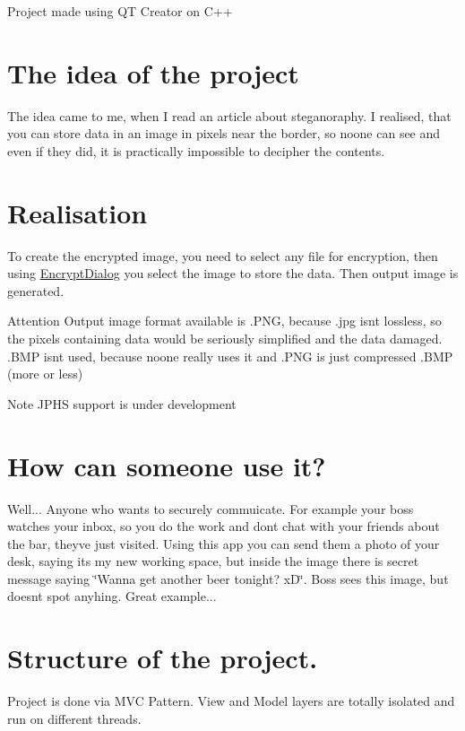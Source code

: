 Project made using QT Creator on C++\hypertarget{index_idea}{}\section{The idea of the project}\label{index_idea}
The idea came to me, when I read an article about steganoraphy. I realised, that you can store data in an image in pixels near the border, so noone can see and even if they did, it is practically impossible to decipher the contents. \hypertarget{index_real}{}\section{Realisation}\label{index_real}
To create the encrypted image, you need to select any file for encryption, then using \mbox{\hyperlink{class_encrypt_dialog}{Encrypt\+Dialog}} you select the image to store the data. Then output image is generated. \begin{DoxyAttention}{Attention}
Output image format available is .P\+NG, because .jpg isn\textquotesingle{}t lossless, so the pixels containing data would be seriously simplified and the data damaged. .B\+MP isn\textquotesingle{}t used, because noone really uses it and .P\+NG is just compressed .B\+MP (more or less) 
\end{DoxyAttention}
\begin{DoxyNote}{Note}
J\+P\+HS support is under development
\end{DoxyNote}
\hypertarget{index_use}{}\section{How can someone use it?}\label{index_use}
Well... Anyone who wants to securely commuicate. For example your boss watches your inbox, so you do the work and don\textquotesingle{}t chat with your friends about the bar, they\textquotesingle{}ve just visited. Using this app you can send them a photo of your desk, saying it\textquotesingle{}s my new working space, but inside the image there is secret message saying \char`\"{}\+Wanna get another beer tonight? x\+D\char`\"{}. Boss sees this image, but doesn\textquotesingle{}t spot anyhing. Great example... \hypertarget{index_structure}{}\section{Structure of the project.}\label{index_structure}
Project is done via M\+VC Pattern. View and Model layers are totally isolated and run on different threads.

